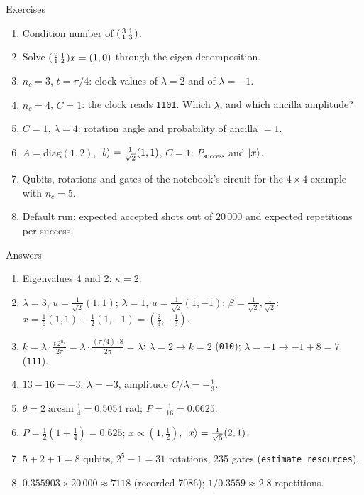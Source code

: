 \documentclass[aspectratio=169,11pt]{beamer}
\newcommand{\lt}{\tilde\lambda}
\begin{document}
\begin{frame}{Exercises}
  \begin{enumerate}
    \item Condition number of $\begin{psmallmatrix}3 & 1\\ 1 & 3\end{psmallmatrix}$.
    \item Solve $\begin{psmallmatrix}2 & 1\\ 1 & 2\end{psmallmatrix}x = (1, 0)$ through the eigen-decomposition.
    \item $n_c = 3$, $t = \pi/4$: clock values of $\lambda = 2$ and of $\lambda = -1$.
    \item $n_c = 4$, $C = 1$: the clock reads \texttt{1101}. Which $\lt$, and which ancilla amplitude?
    \item $C = 1$, $\lambda = 4$: rotation angle and probability of ancilla $= 1$.
    \item $A = \mathrm{diag}(1, 2)$, $\ket b = \frac{1}{\sqrt2}(1, 1)$, $C = 1$: $P_{\text{success}}$ and $\ket x$.
    \item Qubits, rotations and gates of the notebook's circuit for the $4\times4$ example with $n_c = 5$.
    \item Default run: expected accepted shots out of $20\,000$ and expected repetitions per success.
  \end{enumerate}
\end{frame}

\begin{frame}{Answers}
  \small
  \begin{enumerate}
    \item Eigenvalues 4 and 2: $\kappa = 2$.
    \item $\lambda = 3$, $u = \frac{1}{\sqrt2}(1, 1)$; $\lambda = 1$, $u = \frac{1}{\sqrt2}(1, -1)$; $\beta = \frac{1}{\sqrt2}, \frac{1}{\sqrt2}$:
      $x = \frac16(1, 1) + \frac12(1, -1) = \left(\frac23, -\frac13\right)$.
    \item $k = \lambda\cdot\frac{t\,2^{n_c}}{2\pi} = \lambda\cdot\frac{(\pi/4)\cdot8}{2\pi} = \lambda$: $\lambda = 2\to k = 2$ (\texttt{010}); $\lambda = -1\to-1 + 8 = 7$ (\texttt{111}).
    \item $13 - 16 = -3$: $\lt = -3$, amplitude $C/\lt = -\frac13$.
    \item $\theta = 2\arcsin\frac14 = 0.5054$ rad; $P = \frac1{16} = 0.0625$.
    \item $P = \frac12(1 + \frac14) = 0.625$; $x \propto (1, \frac12)$, $\ket x = \frac{1}{\sqrt5}(2, 1)$.
    \item $5 + 2 + 1 = 8$ qubits, $2^5 - 1 = 31$ rotations, 235 gates (\texttt{estimate\_resources}).
    \item $0.355903\times20\,000 \approx 7118$ (recorded 7086); $1/0.3559 \approx 2.8$ repetitions.
  \end{enumerate}
\end{frame}
\end{document}
